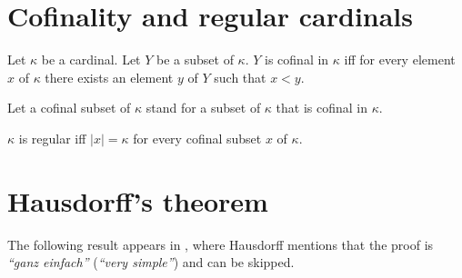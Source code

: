 \documentclass{article}
\newcommand{\card}[1]{\left|#1\right|}
\begin{document}
  \section{Cofinality and regular cardinals}

  \begin{forthel}
    \begin{definition}[Cofinality]
      Let $\kappa$ be a cardinal.
      Let $Y$ be a subset of $\kappa$.
      $Y$ is cofinal in $\kappa$ iff
        for every element $x$ of $\kappa$ there exists an element $y$ of $Y$ such that $x < y$.
    \end{definition}

    Let a cofinal subset of $\kappa$ stand for a subset of $\kappa$ that is cofinal in $\kappa$.


    \begin{definition}
      $\kappa$ is regular iff $\card{x} = \kappa$ for every cofinal subset $x$ of $\kappa$.
    \end{definition}
  \end{forthel}

  \section{Hausdorff's theorem}

  The following result appears in \cite[p.~443]{Hausdorff1908},
  where Hausdorff mentions that the proof is
  \textit{``ganz einfach''} (\textit{``very simple''}) and can be skipped.
\end{document}
